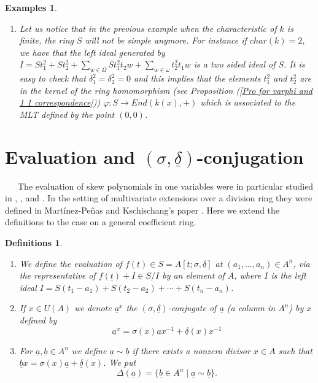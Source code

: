 \documentclass[12pt,a4paper]{article}
\newtheorem{examples}[theorem]{Examples}
\newtheorem{definitions}[theorem]{Definitions}
\newcommand{\de}{\delta}
\newcommand{\si}{\sigma}
\newcommand{\ut}{\underline{t}}
\newcommand{\ua}{\underline{a}}
\newcommand{\ub}{\underline{b}}
\newcommand{\ud}{\underline{\delta}}
\begin{document}
\begin{examples}
{\begin{enumerate}
	\item Let us notice that in the previous example when the characteristic of $k$  is finite,  the ring $S$ will not be simple anymore.  For instance if $char(k)=2$, we have that the left ideal generated by 
$I=St_1^2 + St_2^2 +\sum_{w\in \Omega}St_1^2t_2w +\sum_{w\in \omega} 
t_2^2t_1w$ is a two sided ideal of $S$.  It is easy to check that $\delta_1^2=\delta_2^2=0$ and this implies that the elements $t_1^2$ and $t_2^2$ are in the kernel of the ring homomorphism (see Proposition (\ref{Pro for varphi and 1 1 correspondence})) $\varphi: S \rightarrow End(k(x),+)$ which is  associated to the MLT defined by the point $(0,0)$.	
\end{enumerate}
}
\end{examples}

	
	
	\section{Evaluation and $(\si,\ud)$-conjugation}
	
~~~The evaluation of skew polynomials in one variables were in particular studied in  \cite{LM}, \cite{L2012}, and \cite{BL2023}. In the setting of multivariate extensions over a division ring they were defined in Mart\'i{n}ez-Pe\~nas and Kschischang's paper  \cite{MP2019}.   Here we extend the definitions to the case on a general coefficient ring.	
	\begin{definitions}
		\label{Evaluation and conjugation}
		\begin{enumerate}
			\item We define the evaluation of $f(\ut)\in S=A[\ut; \si,\underline{\de}]$ at $(a_1,\dots,a_n)\in A^n$, via the representative of $f(\ut)+I\in S/I$ by an element of $A$, where $I$ is the left ideal $I=S(t_1-a_1)+S(t_2-a_2)+\cdots +S(t_n-a_n)$. 
			\item 	If $x\in U(A)$ we denote $\ua^x$ the $(\sigma,\ud)$-conjugate of $\ua$ (a column in $A^n$) by $x$ defined by
			\begin{equation}
			\ua^x=\sigma(x)\ua x^{-1}+\ud(x)x^{-1}
		\end{equation}
			\item For $\ua, \ub \in A^n$ we define 
			$\ua\sim \ub$ if there exists a nonzero 
			divisor $x\in A$ such that $\ub 
			x=\sigma(x)\ua +\ud(x)$.   We put
			\begin{equation} \label{a symetric to b}
			\Delta (\ua)=\{\ub \in A^n \mid \ua\sim \ub \}.
		\end{equation}
		\end{enumerate}
	\end{definitions}
\end{document}
